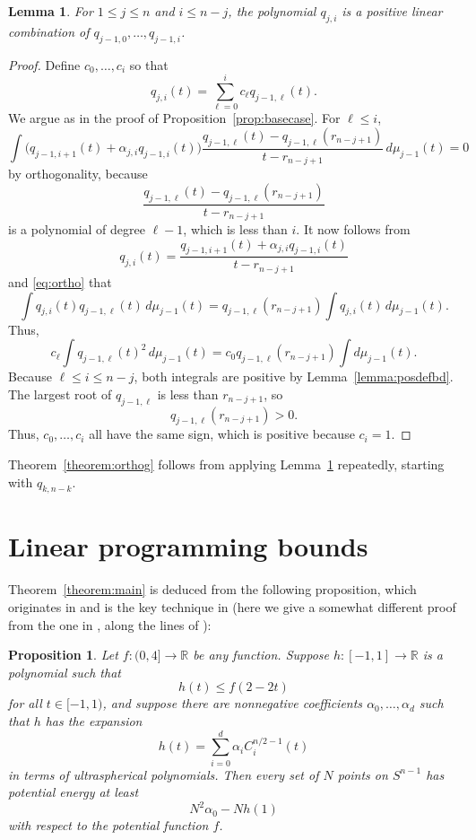 \documentclass{jams-l}
\theoremstyle{plain}
\newtheorem{lemma}[theorem]{Lemma}
\newtheorem{proposition}[theorem]{Proposition}
\numberwithin{theorem}{section}
\theoremstyle{definition}
\numberwithin{equation}{section}
\newcommand{\R}{{\mathbb R}}
\newcommand{\co}{\colon}
\begin{document}
\begin{lemma} \label{lemma:induction}
For $1 \le j \le n$ and $i \le n-j$, the polynomial $q_{j,i}$ is a
positive linear combination of $q_{j-1,0},\dots,q_{j-1,i}$.
\end{lemma}

\begin{proof}
Define $c_0,\dots,c_i$ so that
$$
q_{j,i}(t) = \sum_{\ell = 0}^i c_\ell q_{j-1,\ell}(t).
$$
We argue as in the proof of Proposition~\ref{prop:basecase}. For
$\ell \le i$,
\begin{equation} \label{eq:ortho}
\int \big(q_{j-1,i+1}(t) + \alpha_{j,i} q_{j-1,i}(t)\big)
\frac{q_{j-1,\ell}(t)-q_{j-1,\ell}(r_{n-j+1})}{t-r_{n-j+1}} \,
d\mu_{j-1}(t) = 0
\end{equation}
by orthogonality, because
$$
\frac{q_{j-1,\ell}(t)-q_{j-1,\ell}(r_{n-j+1})}{t-r_{n-j+1}}
$$
is a polynomial of degree $\ell-1$, which is less than $i$.  It
now follows from
$$
q_{j,i}(t) = \frac{q_{j-1,i+1}(t) + \alpha_{j,i}
q_{j-1,i}(t)}{t-r_{n-j+1}}
$$
and \eqref{eq:ortho} that
$$
\int q_{j,i}(t) q_{j-1,\ell}(t) \, d\mu_{j-1}(t) =
q_{j-1,\ell}(r_{n-j+1}) \int q_{j,i}(t) \, d\mu_{j-1}(t).
$$
Thus,
$$
c_\ell \int q_{j-1,\ell}(t)^2 \, d\mu_{j-1}(t) = c_0
q_{j-1,\ell}(r_{n-j+1})  \int d\mu_{j-1}(t).
$$
Because $\ell \le i \le n-j$, both integrals are positive by
Lemma~\ref{lemma:posdefbd}. The largest root of $q_{j-1,\ell}$ is
less than $r_{n-j+1}$, so
$$
q_{j-1,\ell}(r_{n-j+1})>0.
$$
Thus, $c_0,\dots,c_i$ all have the same sign, which is positive
because $c_i=1$.
\end{proof}

Theorem~\ref{theorem:orthog} follows from applying
Lemma~\ref{lemma:induction} repeatedly, starting with $q_{k,n-k}$.

\section{Linear programming bounds}
\label{sec:lpbd}

Theorem~\ref{theorem:main} is deduced from the following
proposition, which originates in \cite{Y} and is the key technique
in \cite{Y,KY1,KY2,A1,A2} (here we give a somewhat different proof
from the one in \cite{Y}, along the lines of \cite{A2}):

\begin{proposition} \label{prop:lpbound}
Let $f \co (0,4] \to \R$ be any function.  Suppose $h \co [-1,1]
\to \R$ is a polynomial such that
$$
h(t) \le f(2-2t)
$$
for all $t \in [-1,1)$, and suppose there are nonnegative
coefficients $\alpha_0,\dots,\alpha_d$ such that $h$ has the
expansion
$$
h(t) = \sum_{i=0}^d \alpha_i C^{n/2-1}_i(t)
$$
in terms of ultraspherical polynomials.  Then every set of $N$
points on $S^{n-1}$ has potential energy at least
$$
N^2\alpha_0 - Nh(1)
$$
with respect to the potential function $f$.
\end{proposition}
\end{document}

